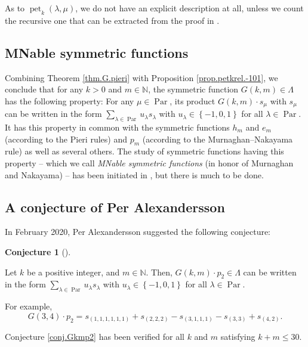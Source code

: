 \documentclass[numbers=enddot,12pt,final,onecolumn,notitlepage]{scrartcl}%
\theoremstyle{definition}
\newtheorem{conj}[theo]{Conjecture}
\newenvironment{conjecture}[1][]
{\begin{conj}[#1]\begin{leftbar}}
{\end{leftbar}\end{conj}}
\let\sumnonlimits\sum
\renewcommand{\sum}{\sumnonlimits\limits}
\begin{document}
As to $\operatorname*{pet}\nolimits_{k}\left(  \lambda,\mu\right)  $, we do
not have an explicit description at all, unless we count the recursive one
that can be extracted from the proof in \cite{GorWil74}.

\subsection{MNable symmetric functions}

Combining Theorem \ref{thm.G.pieri} with Proposition \ref{prop.petkrel.-101},
we conclude that for any $k>0$ and $m\in\mathbb{N}$, the symmetric function
$G\left(  k,m\right)  \in\Lambda$ has the following property: For any $\mu
\in\operatorname*{Par}$, its product $G\left(  k,m\right)  \cdot s_{\mu}$ with
$s_{\mu}$ can be written in the form $\sum_{\lambda\in\operatorname*{Par}%
}u_{\lambda}s_{\lambda}$ with $u_{\lambda}\in\left\{  -1,0,1\right\}  $ for
all $\lambda\in\operatorname*{Par}$. It has this property in common with the
symmetric functions $h_{m}$ and $e_{m}$ (according to the Pieri rules) and
$p_{m}$ (according to the Murnaghan--Nakayama rule) as well as several others.
The study of symmetric functions having this property -- which we call
\textit{MNable symmetric functions} (in honor of Murnaghan and Nakayama) --
has been initiated in \cite[\S 8]{Grinbe20}, but there is much to be done.

\subsection{A conjecture of Per Alexandersson}

In February 2020, Per Alexandersson suggested the following conjecture:

\begin{conjecture}
\label{conj.Gkmp2}Let $k$ be a positive integer, and $m\in\mathbb{N}$. Then,
$G\left(  k,m\right)  \cdot p_{2}\in\Lambda$ can be written in the form
$\sum_{\lambda\in\operatorname*{Par}}u_{\lambda}s_{\lambda}$ with $u_{\lambda
}\in\left\{  -1,0,1\right\}  $ for all $\lambda\in\operatorname*{Par}$.
\end{conjecture}

For example,%
\[
G\left(  3,4\right)  \cdot p_{2}=s_{\left(  1,1,1,1,1,1\right)  }+s_{\left(
2,2,2\right)  }-s_{\left(  3,1,1,1\right)  }-s_{\left(  3,3\right)
}+s_{\left(  4,2\right)  }.
\]


Conjecture \ref{conj.Gkmp2} has been verified for all $k$ and $m$ satisfying
$k+m\leq30$.
\end{document}
